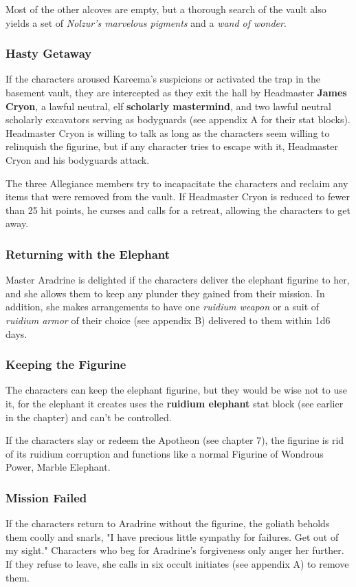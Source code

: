 \documentclass[10pt,a4paper,twoside,bg=print,twocolumn,openany,nodeprecatedcode]{dndbook}
\begin{document}
Most of the other alcoves are empty, but a thorough search of the vault also yields a set of \textit{Nolzur's marvelous pigments} and a \textit{wand of wonder}.

\subsubsection{Hasty Getaway}
If the characters aroused Kareema's suspicions or activated the trap in the basement vault, they are intercepted as they exit the hall by Headmaster \textbf{James Cryon}, a lawful neutral, elf \textbf{scholarly mastermind}, and two lawful neutral scholarly excavators serving as bodyguards (see appendix A for their stat blocks). Headmaster Cryon is willing to talk as long as the characters seem willing to relinquish the figurine, but if any character tries to escape with it, Headmaster Cryon and his bodyguards attack.

The three Allegiance members try to incapacitate the characters and reclaim any items that were removed from the vault. If Headmaster Cryon is reduced to fewer than 25 hit points, he curses and calls for a retreat, allowing the characters to get away.

\subsubsection{Returning with the Elephant}
Master Aradrine is delighted if the characters deliver the elephant figurine to her, and she allows them to keep any plunder they gained from their mission. In addition, she makes arrangements to have one \textit{ruidium weapon} or a suit of \textit{ruidium armor} of their choice (see appendix B) delivered to them within 1d6 days.

\subsubsection{Keeping the Figurine}
The characters can keep the elephant figurine, but they would be wise not to use it, for the elephant it creates uses the \textbf{ruidium elephant} stat block (see earlier in the chapter) and can't be controlled.

If the characters slay or redeem the Apotheon (see chapter 7), the figurine is rid of its ruidium corruption and functions like a normal Figurine of Wondrous Power, Marble Elephant.

\subsubsection{Mission Failed}
If the characters return to Aradrine without the figurine, the goliath beholds them coolly and snarls, "I have precious little sympathy for failures. Get out of my sight." Characters who beg for Aradrine's forgiveness only anger her further. If they refuse to leave, she calls in six occult initiates (see appendix A) to remove them.
\end{document}
